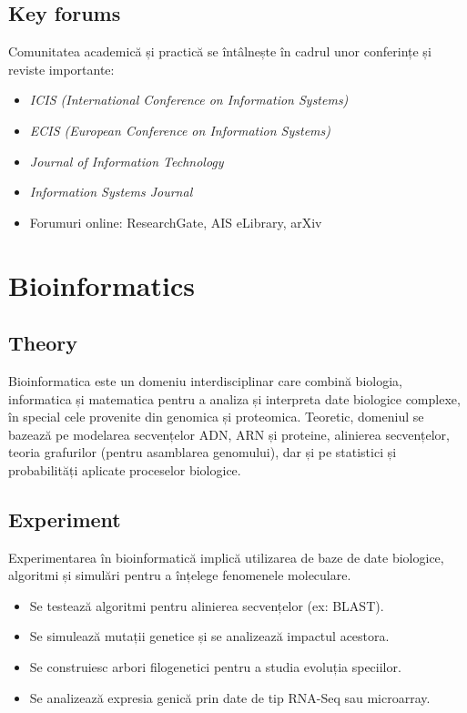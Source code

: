 \documentclass[12pt, letterpaper]{article}
\begin{document}
\subsection*{Key forums}
Comunitatea academică și practică se întâlnește în cadrul unor conferințe și reviste importante:
\begin{itemize}
    \item \textit{ICIS (International Conference on Information Systems)}
    \item \textit{ECIS (European Conference on Information Systems)}
    \item \textit{Journal of Information Technology}
    \item \textit{Information Systems Journal}
    \item Forumuri online: ResearchGate, AIS eLibrary, arXiv
\end{itemize}


\newpage

\section{Bioinformatics}

\subsection*{Theory}
Bioinformatica este un domeniu interdisciplinar care combină biologia, informatica și matematica pentru a analiza și interpreta date biologice complexe, în special cele provenite din genomica și proteomica. Teoretic, domeniul se bazează pe modelarea secvențelor ADN, ARN și proteine, alinierea secvențelor, teoria grafurilor (pentru asamblarea genomului), dar și pe statistici și probabilități aplicate proceselor biologice.

\subsection*{Experiment}
Experimentarea în bioinformatică implică utilizarea de baze de date biologice, algoritmi și simulări pentru a înțelege fenomenele moleculare.
\begin{itemize}
    \item Se testează algoritmi pentru alinierea secvențelor (ex: BLAST).
    \item Se simulează mutații genetice și se analizează impactul acestora.
    \item Se construiesc arbori filogenetici pentru a studia evoluția speciilor.
    \item Se analizează expresia genică prin date de tip RNA-Seq sau microarray.
\end{itemize}
\end{document}
